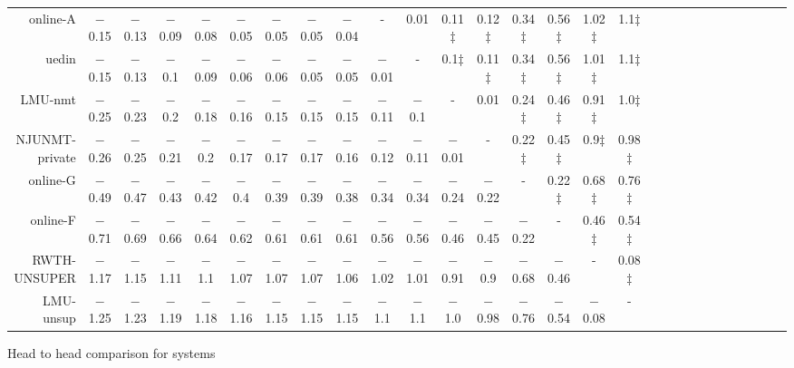 \begin{tabular}{rccccccccccccccccccccccccccc}
online-A & $-$0.15 & $-$0.13 & $-$0.09 & $-$0.08 & $-$0.05 & $-$0.05 & $-$0.05 & $-$0.04 & - &    0.01 &    0.11$\ddagger$ &    0.12$\ddagger$ &    0.34$\ddagger$ &    0.56$\ddagger$ &    1.02$\ddagger$ &    1.1$\ddagger$ \\ 
uedin & $-$0.15 & $-$0.13 & $-$0.1 & $-$0.09 & $-$0.06 & $-$0.06 & $-$0.05 & $-$0.05 & $-$0.01 & - &    0.1$\ddagger$ &    0.11$\ddagger$ &    0.34$\ddagger$ &    0.56$\ddagger$ &    1.01$\ddagger$ &    1.1$\ddagger$ \\ 
LMU-nmt & $-$0.25 & $-$0.23 & $-$0.2 & $-$0.18 & $-$0.16 & $-$0.15 & $-$0.15 & $-$0.15 & $-$0.11 & $-$0.1 & - &    0.01 &    0.24$\ddagger$ &    0.46$\ddagger$ &    0.91$\ddagger$ &    1.0$\ddagger$ \\ 
NJUNMT-private & $-$0.26 & $-$0.25 & $-$0.21 & $-$0.2 & $-$0.17 & $-$0.17 & $-$0.17 & $-$0.16 & $-$0.12 & $-$0.11 & $-$0.01 & - &    0.22$\ddagger$ &    0.45$\ddagger$ &    0.9$\ddagger$ &    0.98$\ddagger$ \\ 
online-G & $-$0.49 & $-$0.47 & $-$0.43 & $-$0.42 & $-$0.4 & $-$0.39 & $-$0.39 & $-$0.38 & $-$0.34 & $-$0.34 & $-$0.24 & $-$0.22 & - &    0.22$\ddagger$ &    0.68$\ddagger$ &    0.76$\ddagger$ \\ 
online-F & $-$0.71 & $-$0.69 & $-$0.66 & $-$0.64 & $-$0.62 & $-$0.61 & $-$0.61 & $-$0.61 & $-$0.56 & $-$0.56 & $-$0.46 & $-$0.45 & $-$0.22 & - &    0.46$\ddagger$ &    0.54$\ddagger$ \\ 
RWTH-UNSUPER & $-$1.17 & $-$1.15 & $-$1.11 & $-$1.1 & $-$1.07 & $-$1.07 & $-$1.07 & $-$1.06 & $-$1.02 & $-$1.01 & $-$0.91 & $-$0.9 & $-$0.68 & $-$0.46 & - &    0.08$\ddagger$ \\ 
LMU-unsup & $-$1.25 & $-$1.23 & $-$1.19 & $-$1.18 & $-$1.16 & $-$1.15 & $-$1.15 & $-$1.15 & $-$1.1 & $-$1.1 & $-$1.0 & $-$0.98 & $-$0.76 & $-$0.54 & $-$0.08 & - \\ 


\end{tabular}
\caption{Head to head comparison for \DEen systems}
\label{pairwise-deen}


